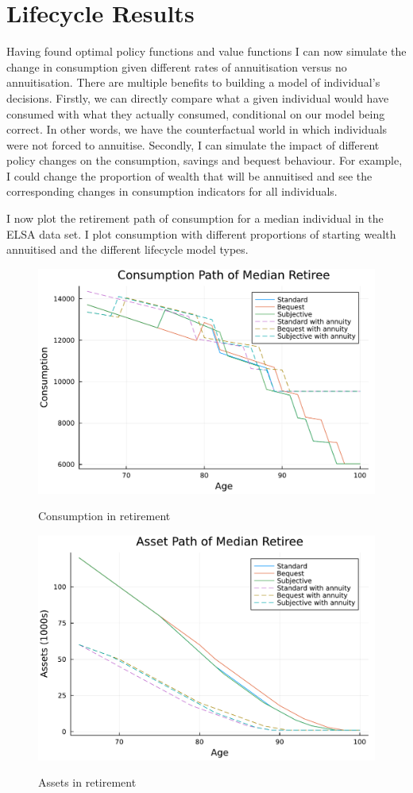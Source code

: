 \documentclass[12pt]{article}
\begin{document}
\section{Lifecycle Results}

Having found optimal policy functions and value functions I can now simulate the
change in consumption given different rates of annuitisation versus no
annuitisation. There are multiple benefits to building a model of individual's
decisions. Firstly, we can directly compare what a given individual would have
consumed with what they actually consumed, conditional on our model being
correct. In other words, we have the counterfactual world in which individuals
were not forced to annuitise. Secondly, I can simulate the impact of different
policy changes on the consumption, savings and bequest behaviour. For example, I
could change the proportion of wealth that will be annuitised and see the
corresponding changes in consumption indicators for all individuals.

I now plot the retirement path of consumption for a median individual in the
ELSA data set. I plot consumption with different proportions of starting wealth
annuitised and the different lifecycle model types.

\begin{figure}[h]
    \caption{Consumption in retirement}
    \centering
    \includegraphics[width=0.7\columnwidth]{figures/consumption_plot_median_retiree.pdf}
    \label{fig:ConsumpPlot}
\end{figure}


\begin{figure}[h]
    \caption{Assets in retirement}
    \centering
    \includegraphics[width=0.7\columnwidth]{figures/asset_plot_median_retiree.pdf}
    \label{fig:AssetPlot}
\end{figure}
\end{document}
